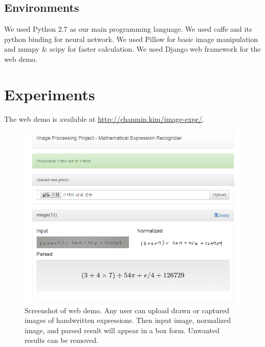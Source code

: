 \documentclass[10pt,twocolumn,letterpaper]{article}
\begin{document}
\subsection{Environments}

We used Python 2.7 as our main programming language.
We used caffe and its python binding for neural network.
We used Pillow for basic image manipulation and numpy \& scipy for faster calculation.
We used Django web framework for the web demo.

\section{Experiments}
%
%
%
%
%


The web demo is available at \url{http://chanmin.kim/image-expr/}.

\begin{figure}[ht]
\centering
\includegraphics[width=0.9\linewidth]{img/web_demo.png}
\caption{Screenshot of web demo. Any user can upload drawn or captured images of handwritten expressions. Then input image, normalized image, and parsed result will appear in a box form. Unwanted results can be removed.}
\label{fig:thresholding}
\end{figure}
\end{document}
